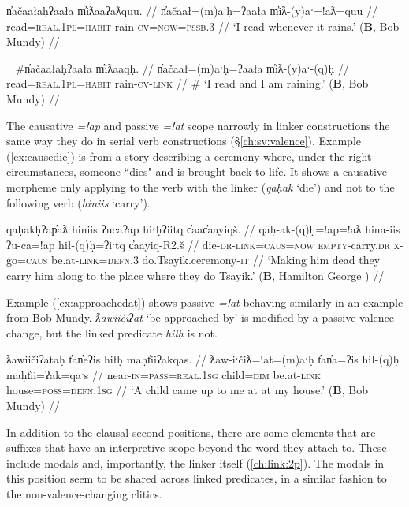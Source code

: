 \ex \label{ex:readrain}
\begingl
\glpreamble n̓ačaałaḥʔaała m̓iƛaaʔaƛquu. //
\gla n̓ačaał=(m)aˑḥ=ʔaała m̓iƛ-(y)aˑ=!aƛ=quu //
\glb read=\textsc{real.1pl}=\textsc{habit} rain-\textsc{cv}=\textsc{now}=\textsc{pssb.3} //
\glft `I read whenever it rains.' (\textbf{B}, Bob Mundy) //
\endgl
\xe

\ex~ \label{ex:readrain2}
\begingl
\glpreamble \#n̓ačaałaḥʔaała m̓iƛaaqḥ. //
\gla n̓ačaał=(m)aˑḥ=ʔaała m̓iƛ-(y)aˑ-(q)ḥ //
\glb read=\textsc{real.1pl}=\textsc{habit} rain-\textsc{cv}-\textsc{link} //
\glft \# `I read and I am raining.' (\textbf{B}, Bob Mundy) //
\endgl
\xe

The causative \textit{=!ap} and passive \textit{=!at} scope narrowly in linker constructions the same way they do in serial verb constructions (\S\ref{ch:sv:valence}). Example (\ref{ex:causedie}) is from a story describing a ceremony where, under the right circumstances, someone ``dies" and is brought back to life. It shows a causative morpheme only applying to the verb with the linker (\textit{qaḥak} `die') and not to the following verb (\textit{hiniis} `carry').

\ex \label{ex:causedie}
\begingl
\glpreamble qaḥakḥʔap̓aƛ hiniis ʔucaʔap hiłḥʔiitq c̓aac̓aayiqš. //
\gla qaḥ-ak-(q)ḥ=!ap=!aƛ hina-iis ʔu-ca=!ap hił-(q)ḥ=ʔiˑtq c̓aayiq-R2.š //
\glb die-\textsc{dr}-\textsc{link}=\textsc{caus}=\textsc{now} \textsc{empty}-carry.\textsc{dr} \textsc{x}-go=\textsc{caus} be.at-\textsc{link}=\textsc{defn.3} do.Tsayik.ceremony-\textsc{it} //
\glft `Making him dead they carry him along to the place where they do Tsayik.' (\textbf{B}, Hamilton George \cite[106]{sapir1939}) //
\endgl
\xe

Example (\ref{ex:approachedat}) shows passive \textit{=!at} behaving similarly in an example from Bob Mundy. \textit{ƛawiičiʔat} `be approached by' is modified by a passive valence change, but the linked predicate \textit{hiłḥ} is not.

\ex \label{ex:approachedat}
\begingl
\glpreamble ƛawiičiʔataḥ t̓an̓eʔis hiłḥ maḥt̓iiʔakqas. //
\gla ƛaw-iˑčiƛ=!at=(m)aˑḥ t̓an̓a=ʔis hił-(q)ḥ maḥt̓ii=ʔak=qaˑs //
\glb near-\textsc{in}=\textsc{pass}=\textsc{real.1sg} child=\textsc{dim} be.at-\textsc{link} house=\textsc{poss}=\textsc{defn.1sg} //
\glft `A child came up to me at at my house.' (\textbf{B}, Bob Mundy) //
\endgl
\xe

In addition to the clausal second-positions, there are some elements that are suffixes that have an interpretive scope beyond the word they attach to. These include modals and, importantly, the linker itself (\ref{ch:link:2p}). The modals in this position seem to be shared across linked predicates, in a similar fashion to the non-valence-changing clitics.


